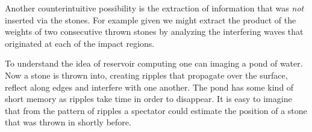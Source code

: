 	Another counterintuitive possibility is the extraction of information that was \textit{not} inserted via the stones. For example given we might extract the product of the weights of two consecutive thrown stones by analyzing the interfering waves that originated at each of the impact regions. 
	
	
	

To understand the idea of reservoir computing one can imaging a pond of water. Now a stone is thrown into, creating ripples that propagate over the surface, reflect along edges and interfere with one another. The pond has some kind of short memory as ripples take time in order to disappear. 
It is easy to imagine that from the pattern of ripples a spectator could estimate the position of a stone that was thrown in shortly before.  

